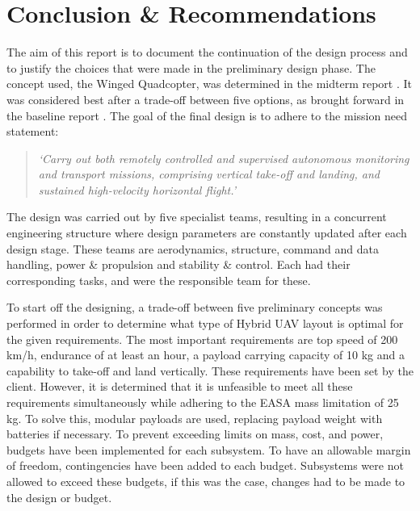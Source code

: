 \chapter{Conclusion \& Recommendations}
\setlength{\parindent}{15pt}
\label{ch:conc_reco}

The aim of this report is to document the continuation of the design process and to justify the choices that were made in the preliminary design phase. The concept used, the Winged Quadcopter, was determined in the midterm report \cite{midterm}. It was considered best after a trade-off between five options, as brought forward in the baseline report \cite{baseline}. The goal of the final design is to adhere to the mission need statement:
\begin{quote}
\itshape `Carry out both remotely controlled and supervised autonomous monitoring and transport missions, comprising vertical take-off and landing, and sustained high-velocity horizontal flight.'
\end{quote}

The design was carried out by five specialist teams, resulting in a concurrent engineering structure where design parameters are constantly updated after each design stage. These teams are aerodynamics, structure, command and data handling, power \& propulsion and stability \& control. Each had their corresponding tasks, and were the responsible team for these.

To start off the designing, a trade-off between five preliminary concepts was performed in order to determine what type of Hybrid UAV layout is optimal for the given requirements. The most important requirements are top speed of 200 km/h, endurance of at least an hour, a payload carrying capacity of 10 kg and a capability to take-off and land vertically. These requirements have been set by the client. However, it is determined that it is unfeasible to meet all these requirements simultaneously while adhering to the EASA mass limitation of 25 kg. To solve this, modular payloads are used, replacing payload weight with batteries if necessary. To prevent exceeding limits on mass, cost, and power, budgets have been implemented for each subsystem. To have an allowable margin of freedom, contingencies have been added to each budget. Subsystems were not allowed to exceed these budgets, if this was the case, changes had to be made to the design or budget. 


